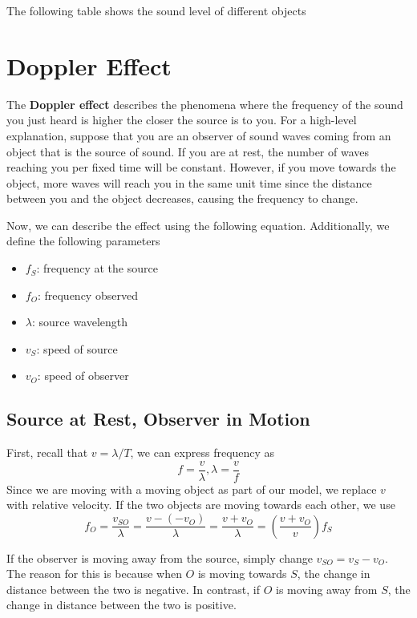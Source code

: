 The following table shows the sound level of different objects

\section{Doppler Effect}

The \textbf{Doppler effect} describes the phenomena where the frequency of the sound you just heard
is higher the closer the source is to you. For a high-level explanation, suppose that you are an
observer of sound waves coming from an object that is the source of sound. If you are at rest,
the number of waves reaching you per fixed time will be constant. However, if you move towards the 
object, more waves will reach you in the same unit time since the distance between you and the object 
decreases, causing the frequency to change.

Now, we can describe the effect using the following equation. Additionally, we define the following
parameters
\begin{itemize}
    \item $f_S$: frequency at the source
    \item $f_O$: frequency observed
    \item $\lambda$: source wavelength 
    \item $v_S$: speed of source
    \item $v_O$: speed of observer
\end{itemize}

\subsection{Source at Rest, Observer in Motion}

First, recall that $v = \lambda/T$, we can express frequency as
\[ f = \frac{v}{\lambda}, \lambda = \frac{v}{f} \]
Since we are moving with a moving object as part of our model, we replace
$v$ with relative velocity. If the two objects are moving towards each other, we use
\begin{equation}\label{17.15}
    f_O = \frac{v_{SO}}{\lambda} = \frac{v - (-v_O)}{\lambda} = \frac{v + v_O}{\lambda}
        = \left(\frac{v + v_O}{v}\right)f_S
\end{equation}

If the observer is moving away from the source, simply change $v_{SO} = v_S - v_O$. The reason
for this is because when $O$ is moving towards $S$, the change in distance between the two is
negative. In contrast, if $O$ is moving away from $S$, the change in distance between the two is 
positive.

